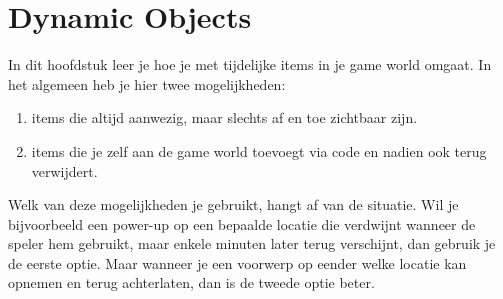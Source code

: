 \chapter{Dynamic Objects}
In dit hoofdstuk leer je hoe je met tijdelijke items in je game world omgaat. In het algemeen heb je hier twee mogelijkheden:

\begin{enumerate}
	\item items die altijd aanwezig, maar slechts af en toe zichtbaar zijn.
	\item items die je zelf aan de game world toevoegt via code en nadien ook terug verwijdert.
\end{enumerate}

Welk van deze mogelijkheden je gebruikt, hangt af van de situatie. Wil je bijvoorbeeld een power-up op een bepaalde locatie die verdwijnt wanneer de speler hem gebruikt, maar enkele minuten later terug verschijnt, dan gebruik je de eerste optie. Maar wanneer je een voorwerp op eender welke locatie kan opnemen en terug achterlaten, dan is de tweede optie beter.

